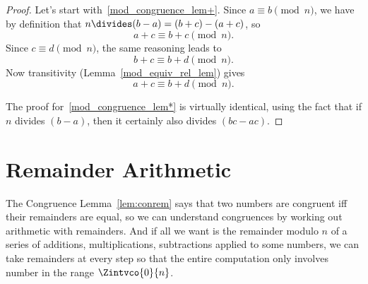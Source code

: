 \begin{proof}
Let's start with~\ref{mod_congruence_lem+}.  Since $a \equiv b
\pmod{n}$, we have by definition that $n \divides (b-a) =(b+c)-(a+c)$,
so
\[
a+c \equiv b+c \pmod{n}.
\]
Since $c \equiv d \pmod{n}$, the same reasoning leads to
\[
b + c \equiv b + d \pmod{n}.
\]
Now transitivity (Lemma~\ref{mod_equiv_rel_lem}) gives
\[
a + c \equiv b + d \pmod{n}.
\]
 
The proof for~\ref{mod_congruence_lem*} is virtually identical, using
the fact that if $n$ divides $(b-a)$, then it certainly also divides
$(bc-ac)$.
\end{proof}

\begin{problems}
\practiceproblems
{}

\classproblems
{}
\end{problems}

\section{Remainder Arithmetic}\label{remainder_arithmetic_sec}

The Congruence Lemma~\ref{lem:conrem} says that two numbers are
congruent iff their remainders are equal, so we can understand
congruences by working out arithmetic with remainders.  And if all we
want is the remainder modulo $n$ of a series of additions,
multiplications, subtractions applied to some numbers, we can take
remainders at every step so that the entire computation only involves
number in the range $\Zintvco{0}{n}$.


